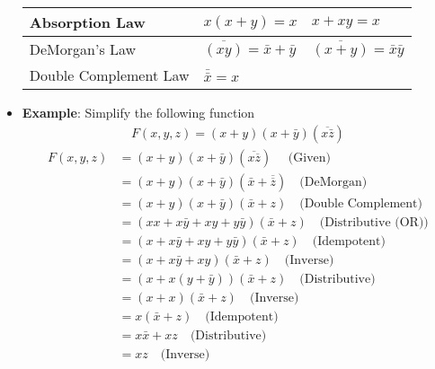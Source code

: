 \documentclass{report}
\begin{document}
\begin{itemize}
\begin{center}
\begin{tabular}{|l|l|l|}
                    Absorption Law               & $x(x + y) = x$                 & $x + xy = x$ \\ \hline
                    DeMorgan’s Law               & $\overline{(xy)} = \bar{x} + \bar{y}$ & $\overline{(x + y)} = \bar{x}\bar{y}$ \\ \hline
                    Double Complement Law        & $\bar{\bar{x}} = x$            &  \\ \hline
                \end{tabular}
            \end{center}
        \item \textbf{Example}: Simplify the following function
            \begin{align*}
                F(x,y,z) = (x+y)(x+\bar{y})(\overline{x \bar{z}})
            \end{align*}
            \begin{align*}
                F(x,y,z) &= (x+y)(x+ \bar{y})(\overline{x \overline{z}}) \quad \text{ (Given)} \\
                         &= (x+y)(x+ \bar{y})( \bar{x} + \overline{ \overline{z}}) \quad \text{(DeMorgan)} \\
                         &= (x+y)(x+ \bar{y})( \bar{x} +  z) \quad \text{(Double Complement)} \\
                         &= (xx + x \bar{y} + xy + y \bar{y})( \bar{x} + z) \quad \text{(Distributive (OR))} \\
                         &= (x + x \bar{y} + xy + y \bar{y})( \bar{x} + z) \quad \text{(Idempotent)} \\ 
                         &= (x + x \bar{y} + xy)( \bar{x} + z) \quad \text{(Inverse)} \\
                         &= (x + x (y + \bar{y}))( \bar{x} + z) \quad \text{(Distributive)} \\
                         &= (x + x)( \bar{x} + z) \quad \text{(Inverse)} \\
                         &= x( \bar{x} + z) \quad \text{(Idempotent)} \\
                         &= x \bar{x} + xz \quad \text{(Distributive)} \\
                         &=  xz \quad \text{(Inverse)}
            \end{align*}

    \end{itemize}

    \pagebreak 
\end{document}
